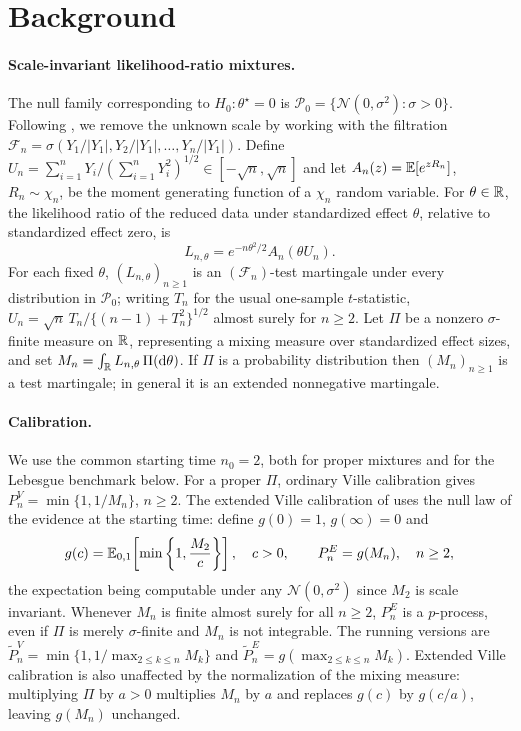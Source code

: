 \documentclass{article}
\begin{document}
\section{Background}
\label{sec:background}

\paragraph{Scale-invariant likelihood-ratio mixtures.}
The null family corresponding to $H_0:\theta^\star=0$ is
$\mathcal P_0=\{\mathcal N(0,\sigma^2):\sigma>0\}$. Following
\citet{Lai1976,PerezOrtiz2024,Wang2025}, we remove the unknown scale by
working with the filtration
$\mathcal F_n=\sigma(Y_1/|Y_1|,Y_2/|Y_1|,\ldots,Y_n/|Y_1|)$. Define
$U_n=\sum_{i=1}^nY_i/(\sum_{i=1}^nY_i^2)^{1/2}\in[-\sqrt n,\sqrt n]$ and
let $A_n(z)=\mathbb{E}[e^{zR_n}]$, $R_n\sim\chi_n$, be the moment generating
function of a $\chi_n$ random variable. For $\theta\in\mathbb{R}$, the likelihood
ratio of the reduced data under standardized effect $\theta$, relative to
standardized effect zero, is
\begin{equation}
\label{eq:hthetadef}
  L_{n,\theta}=e^{-n\theta^2/2}A_n(\theta U_n).
\end{equation}
For each fixed $\theta$, $(L_{n,\theta})_{n\geq1}$ is an
$(\mathcal F_n)$-test martingale under every distribution in
$\mathcal P_0$; writing $T_n$ for the usual one-sample $t$-statistic,
$U_n=\sqrt n\,T_n/\{(n-1)+T_n^2\}^{1/2}$ almost surely for $n\geq2$. Let
$\Pi$ be a nonzero $\sigma$-finite measure on $\mathbb{R}$, representing a mixing
measure over standardized effect sizes, and set
$M_n=\int_{\mathbb{R}} L_{n,\theta}\,\Pi(\mathrm{d}\theta)$. If $\Pi$ is a probability
distribution then $(M_n)_{n\geq1}$ is a test martingale; in general it is
an extended nonnegative martingale.

\paragraph{Calibration.}
We use the common starting time $n_0=2$, both for proper mixtures and for
the Lebesgue benchmark below. For a proper $\Pi$, ordinary Ville
calibration gives $P_n^V=\min\{1,1/M_n\}$, $n\geq2$. The extended Ville
calibration of \citet{Wang2025a} uses the null law of the evidence at the
starting time: define $g(0)=1$, $g(\infty)=0$ and
\begin{equation}
\label{eq:general-extended-calibration}
  g(c)=\mathbb{E}_{0,1}\!\left[\min\left\{1,\frac{M_2}{c}\right\}\right],
  \quad c>0,
  \qquad
  P_n^E=g(M_n),
  \quad n\geq2,
\end{equation}
the expectation being computable under any $\mathcal N(0,\sigma^2)$ since
$M_2$ is scale invariant. Whenever $M_n$ is finite almost surely for all
$n\geq2$, $P_n^E$ is a $p$-process, even if $\Pi$ is merely
$\sigma$-finite and $M_n$ is not integrable. The running
versions are
$\widetilde P_n^V=\min\{1,1/\max_{2\leq k\leq n}M_k\}$ and
$\widetilde P_n^E=g(\max_{2\leq k\leq n}M_k)$. Extended Ville calibration
is also unaffected by the normalization of the mixing measure:
multiplying $\Pi$ by $a>0$ multiplies $M_n$ by $a$ and replaces $g(c)$ by
$g(c/a)$, leaving $g(M_n)$ unchanged.
\end{document}

